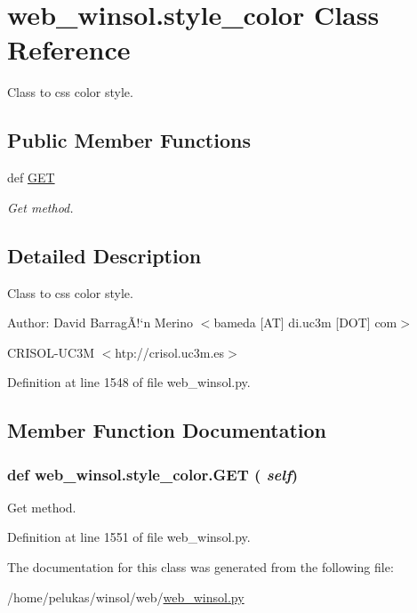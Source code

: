 \hypertarget{classweb__winsol_1_1style__color}{
\section{web\_\-winsol.style\_\-color Class Reference}
\label{classweb__winsol_1_1style__color}
}
Class to css color style.  


\subsection*{Public Member Functions}
\begin{CompactItemize}
\item 
def \hyperlink{classweb__winsol_1_1style__color_19f2db6dcedcb3c280c6ae0167a317ae}{GET}
\begin{CompactList}\small\item\em Get method. \item\end{CompactList}\end{CompactItemize}


\subsection{Detailed Description}
Class to css color style. 

\begin{Desc}
\item[Author:]David Barrag\~{A}!`n Merino $<$bameda \mbox{[}AT\mbox{]} di.uc3m \mbox{[}DOT\mbox{]} com$>$ 

CRISOL-UC3M $<$htp://crisol.uc3m.es$>$ \end{Desc}




Definition at line 1548 of file web\_\-winsol.py.

\subsection{Member Function Documentation}
\hypertarget{classweb__winsol_1_1style__color_19f2db6dcedcb3c280c6ae0167a317ae}{
\subsubsection[GET]{\setlength{\rightskip}{0pt plus 5cm}def web\_\-winsol.style\_\-color.GET ( {\em self})}}
\label{classweb__winsol_1_1style__color_19f2db6dcedcb3c280c6ae0167a317ae}


Get method. 



Definition at line 1551 of file web\_\-winsol.py.

The documentation for this class was generated from the following file:\begin{CompactItemize}
\item 
/home/pelukas/winsol/web/\hyperlink{web__winsol_8py}{web\_\-winsol.py}\end{CompactItemize}
